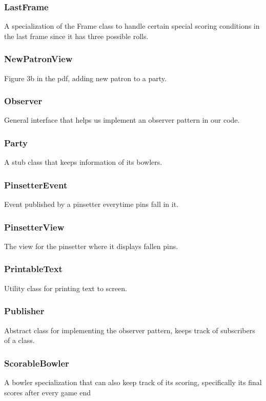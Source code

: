 \subsubsection{LastFrame}
A specialization of the Frame class to handle certain special scoring conditions in the last frame since it has three possible rolls.

\subsubsection{NewPatronView}
Figure 3b in the pdf, adding new patron to a party.

\subsubsection{Observer}
General interface that helps us implement an observer pattern in our code.

\subsubsection{Party}
A stub class that keeps information of its bowlers.

\subsubsection{PinsetterEvent}
Event published by a pinsetter everytime pins fall in it.

\subsubsection{PinsetterView}
The view for the pinsetter where it displays fallen pins.

\subsubsection{PrintableText}
Utility class for printing text to screen.

\subsubsection{Publisher}
Abstract class for implementing the observer pattern, keeps track of subscribers of a class.

\subsubsection{ScorableBowler}
A bowler specialization that can also keep track of its scoring, specifically its final scores after every game end

